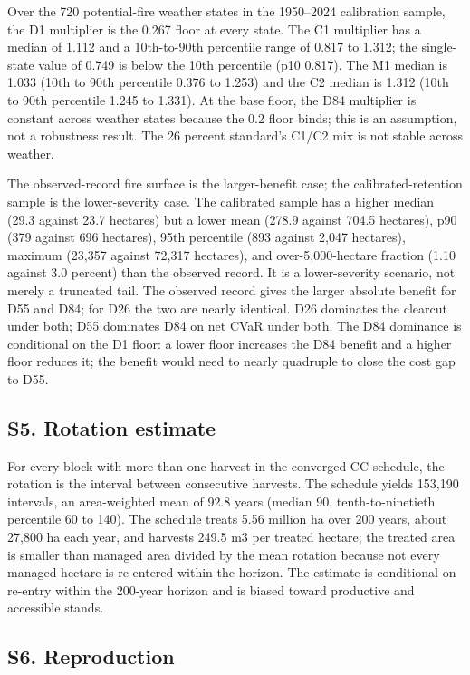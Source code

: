 Over the 720 potential-fire weather states in the 1950--2024 calibration sample, the D1 multiplier
is the 0.267 floor at every state. The C1 multiplier has a median of 1.112 and a 10th-to-90th
percentile range of 0.817 to 1.312; the single-state value of 0.749 is below the 10th percentile
(p10 0.817). The M1 median is 1.033 (10th to 90th percentile 0.376 to 1.253) and the C2 median is 1.312 (10th
to 90th percentile 1.245 to 1.331). At the base floor, the D84 multiplier is constant across weather states because the 0.2 floor
binds; this is an assumption, not a robustness result. The 26 percent standard's C1/C2 mix is not stable across
weather.

The observed-record fire surface is the larger-benefit case; the calibrated-retention sample is the
lower-severity case. The calibrated sample has a higher median (29.3 against 23.7 hectares) but a
lower mean (278.9 against 704.5 hectares), p90 (379 against 696 hectares), 95th percentile (893
against 2,047 hectares), maximum (23,357 against 72,317 hectares), and over-5,000-hectare fraction
(1.10 against 3.0 percent) than the observed record. It is a lower-severity scenario, not merely a
truncated tail. The observed record gives the larger absolute benefit for D55 and D84; for D26 the
two are nearly identical. D26 dominates the clearcut under
both; D55 dominates D84 on net CVaR under both. The D84 dominance is conditional on the D1 floor: a lower floor
increases the D84 benefit and a higher floor reduces it; the benefit would need to nearly quadruple
to close the cost gap to D55.

\subsection*{S5. Rotation estimate}

For every block with more than one harvest in the converged CC schedule, the rotation is the interval
between consecutive harvests. The schedule yields 153,190 intervals, an area-weighted mean of 92.8
years (median 90, tenth-to-ninetieth percentile 60 to 140). The schedule treats 5.56 million ha over
200 years, about 27,800 ha each year, and harvests 249.5 m3 per treated hectare; the treated area is
smaller than managed area divided by the mean rotation because not every managed hectare is
re-entered within the horizon. The estimate is conditional on re-entry within the 200-year horizon
and is biased toward productive and accessible stands.

\subsection*{S6. Reproduction}

